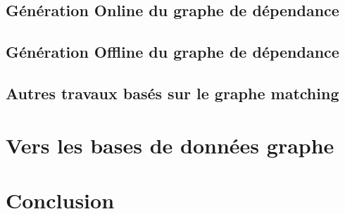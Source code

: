  \subsection{Génération Online du graphe de dépendance}
  \label{sec:generation-online-du}

  \subsection{Génération Offline du graphe de dépendance}
  \label{sec:gener-offl-du}

  \subsection{Autres travaux basés sur le graphe matching}
  \label{sec:autres-travaux}

\section{Vers les bases de données graphe}
\label{sec:vers-les-bases}

\section{Conclusion}
\label{sec:conclusion-2}



